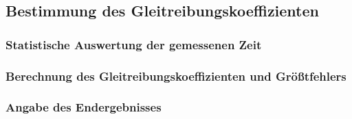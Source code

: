 \subsection{Bestimmung des Gleitreibungskoeffizienten}

\subsubsection{Statistische Auswertung der gemessenen Zeit}

\subsubsection{Berechnung des Gleitreibungskoeffizienten und Größtfehlers}

\subsubsection{Angabe des Endergebnisses}